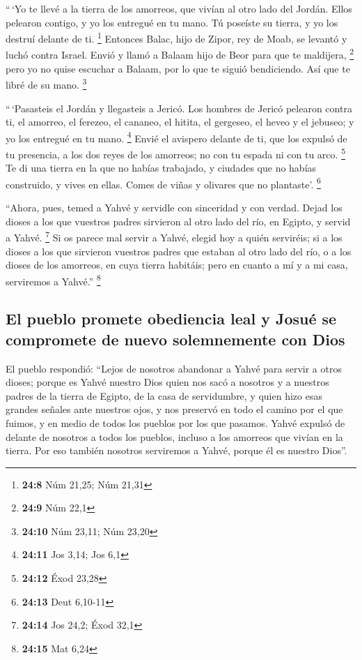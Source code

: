 \begin{paracol}{2}
 ``\,`Yo te llevé a la tierra de los amorreos, que vivían
al otro lado del Jordán. Ellos pelearon contigo, y yo los entregué en tu
mano. Tú poseíste su tierra, y yo los destruí delante de ti. \footnote{\textbf{24:8}
  Núm 21,25; Núm 21,31}  Entonces Balac, hijo de Zipor,
rey de Moab, se levantó y luchó contra Israel. Envió y llamó a Balaam
hijo de Beor para que te maldijera, \footnote{\textbf{24:9} Núm 22,1}
 pero yo no quise escuchar a Balaam, por lo que te siguió
bendiciendo. Así que te libré de su mano. \footnote{\textbf{24:10} Núm
  23,11; Núm 23,20}

 ``\,`Pasasteis el Jordán y llegasteis a Jericó. Los
hombres de Jericó pelearon contra ti, el amorreo, el ferezeo, el
cananeo, el hitita, el gergeseo, el heveo y el jebuseo; y yo los
entregué en tu mano. \footnote{\textbf{24:11} Jos 3,14; Jos 6,1}
 Envié el avispero delante de ti, que los expulsó de tu
presencia, a los dos reyes de los amorreos; no con tu espada ni con tu
arco. \footnote{\textbf{24:12} Éxod 23,28}  Te di una
tierra en la que no habías trabajado, y ciudades que no habías
construido, y vives en ellas. Comes de viñas y olivares que no
plantaste'. \footnote{\textbf{24:13} Deut 6,10-11}

 ``Ahora, pues, temed a Yahvé y servidle con sinceridad y
con verdad. Dejad los dioses a los que vuestros padres sirvieron al otro
lado del río, en Egipto, y servid a Yahvé. \footnote{\textbf{24:14} Jos
  24,2; Éxod 32,1}  Si os parece mal servir a Yahvé,
elegid hoy a quién serviréis; si a los dioses a los que sirvieron
vuestros padres que estaban al otro lado del río, o a los dioses de los
amorreos, en cuya tierra habitáis; pero en cuanto a mí y a mi casa,
serviremos a Yahvé.'' \footnote{\textbf{24:15} Mat 6,24}

\hypertarget{el-pueblo-promete-obediencia-leal-y-josuuxe9-se-compromete-de-nuevo-solemnemente-con-dios}{%
\subsection{El pueblo promete obediencia leal y Josué se compromete de
nuevo solemnemente con
Dios}\label{el-pueblo-promete-obediencia-leal-y-josuuxe9-se-compromete-de-nuevo-solemnemente-con-dios}}

 El pueblo respondió: ``Lejos de nosotros abandonar a
Yahvé para servir a otros dioses;  porque es Yahvé
nuestro Dios quien nos sacó a nosotros y a nuestros padres de la tierra
de Egipto, de la casa de servidumbre, y quien hizo esas grandes señales
ante nuestros ojos, y nos preservó en todo el camino por el que fuimos,
y en medio de todos los pueblos por los que pasamos. 
Yahvé expulsó de delante de nosotros a todos los pueblos, incluso a los
amorreos que vivían en la tierra. Por eso también nosotros serviremos a
Yahvé, porque él es nuestro Dios''.


\end{paracol}
